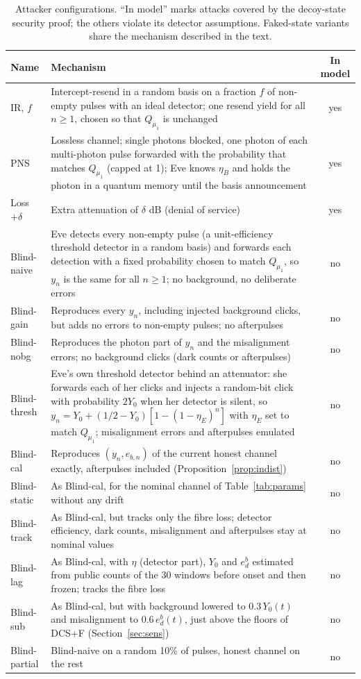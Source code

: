 \begin{table}[t]
\centering
\caption{Attacker configurations. ``In model'' marks attacks covered by the decoy-state security proof; the others violate its detector assumptions. Faked-state variants share the mechanism described in the text.}\label{tab:attacks}
\small
\begin{tabular}{p{2.4cm}p{8.8cm}c}
\hline
Name & Mechanism & In model \\
\hline
IR, $f$ & Intercept-resend in a random basis on a fraction $f$ of non-empty pulses with an ideal detector; one resend yield for all $n\geq1$, chosen so that $Q_{\mu_1}$ is unchanged & yes \\
PNS & Lossless channel; single photons blocked, one photon of each multi-photon pulse forwarded with the probability that matches $Q_{\mu_1}$ (capped at 1); Eve knows $\eta_B$ and holds the photon in a quantum memory until the basis announcement \cite{brassard2000} & yes \\
Loss $+\delta$ & Extra attenuation of $\delta$ dB (denial of service) & yes \\
Blind-naive & Eve detects every non-empty pulse (a unit-efficiency threshold detector in a random basis) and forwards each detection with a fixed probability chosen to match $Q_{\mu_1}$, so $y_n$ is the same for all $n\geq1$; no background, no deliberate errors & no \\
Blind-gain & Reproduces every $y_n$, including injected background clicks, but adds no errors to non-empty pulses; no afterpulses & no \\
Blind-nobg & Reproduces the photon part of $y_n$ and the misalignment errors; no background clicks (dark counts or afterpulses) & no \\
Blind-thresh & Eve's own threshold detector behind an attenuator: she forwards each of her clicks and injects a random-bit click with probability $2Y_0$ when her detector is silent, so $y_n=Y_0+(1/2-Y_0)[1-(1-\eta_E)^n]$ with $\eta_E$ set to match $Q_{\mu_1}$; misalignment errors and afterpulses emulated & no \\
Blind-cal & Reproduces $(y_n,e_{b,n})$ of the current honest channel exactly, afterpulses included (Proposition~\ref{prop:indist}) & no \\
Blind-static & As Blind-cal, for the nominal channel of Table~\ref{tab:params} without any drift & no \\
Blind-track & As Blind-cal, but tracks only the fibre loss; detector efficiency, dark counts, misalignment and afterpulses stay at nominal values & no \\
Blind-lag & As Blind-cal, with $\eta$ (detector part), $Y_0$ and $e^b_d$ estimated from public counts of the 30 windows before onset and then frozen; tracks the fibre loss & no \\
Blind-sub & As Blind-cal, but with background lowered to $0.3\,Y_0(t)$ and misalignment to $0.6\,e^b_d(t)$, just above the floors of DCS+F (Section~\ref{sec:sens}) & no \\
Blind-partial & Blind-naive on a random 10\% of pulses, honest channel on the rest & no \\
\hline
\end{tabular}
\end{table}


